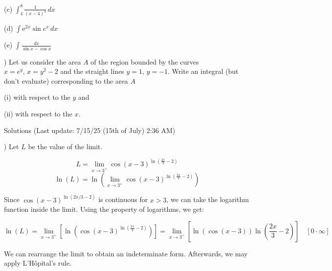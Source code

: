 \documentclass{article}
\begin{document}
\hfill

\noindent (c) $\displaystyle \int_4^8 \frac{1}{(x-4)^3}\, dx$

\hfill

\noindent (d) $\displaystyle \int\mathrm{e}^{2x}\sin e^x\,dx$

\hfill

\noindent (e) $\displaystyle \int\frac{dx}{\sin x - \cos x}$

\hfill

) Let us consider the area $A$ of the region bounded by the curves $x=e^y, \, x=y^2-2$ and the straight lines $y=1, \, y=-1$. Write an integral (but don't evaluate) corresponding to the area $A$

\hfill

\noindent (i) with respect to the $y$ and

\noindent (ii) with respect to the $x$.

\newpage

\begin{center}
Solutions (Last update: 7/15/25 (15th of July) 2:36 AM)
\end{center}

) Let $L$ be the value of the limit.

\begin{equation*} L = \lim_{x\to3^+}\cos(x-3)^{\ln\left(\frac{2x}{3}-2\right)}\end{equation*}
\begin{equation*}\ln(L) =\ln\left( \lim_{x\to3^+}\cos(x-3)^{\ln\left(\frac{2x}{3}-2\right)}\right)\end{equation*}

\hfill

\noindent Since $\cos(x-3)^{\ln(2x/3 -2)}$ is continuous for $x>3$, we can take the logarithm function inside the limit. Using the property of logarithms, we get:

\begin{equation*}\ln(L) =\lim_{x\to3^+}\left[ \ln\left(\cos(x-3)^{\ln\left(\frac{2x}{3}-2\right)}\right)\right] = \lim_{x\to3^+}\left[ \ln\left(\cos(x-3)\right)\ln\left(\frac{2x}{3}-2\right)\right]\quad[0 \cdot \infty] \end{equation*}

\hfill

\noindent We can rearrange the limit to obtain an indeterminate form. Afterwards, we may apply L'Hôpital's rule.
\end{document}
